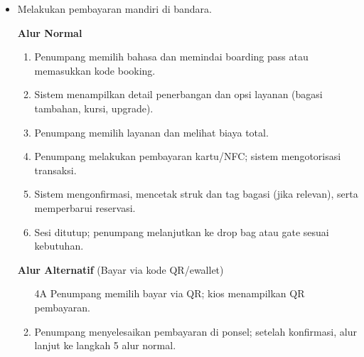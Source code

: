 \documentclass[a4paper]{article}
\begin{document}
\begin{enumerate}[itemsep=1em]
\begin{itemize}[itemsep=1em]
    \vspace{1em}


    \item Melakukan pembayaran mandiri di bandara.


    \vspace{1em}

    \textbf{Alur Normal}
    \begin{enumerate}[nosep]
      \item Penumpang memilih bahasa dan memindai boarding pass atau memasukkan kode booking.
      \item Sistem menampilkan detail penerbangan dan opsi layanan (bagasi tambahan, kursi, upgrade).
      \item Penumpang memilih layanan dan melihat biaya total.
      \item Penumpang melakukan pembayaran kartu/NFC; sistem mengotorisasi transaksi.
      \item Sistem mengonfirmasi, mencetak struk dan tag bagasi (jika relevan), serta memperbarui reservasi.
      \item Sesi ditutup; penumpang melanjutkan ke drop bag atau gate sesuai kebutuhan.
    \end{enumerate}

    \vspace{1em}

    \textbf{Alur Alternatif} (Bayar via kode QR/ewallet)
    \begin{enumerate}[nosep]
      \item[4A] Penumpang memilih bayar via QR; kios menampilkan QR pembayaran.
      \item Penumpang menyelesaikan pembayaran di ponsel; setelah konfirmasi, alur lanjut ke langkah 5 alur normal.
    \end{enumerate}


\end{itemize}
\end{enumerate}
\end{document}
